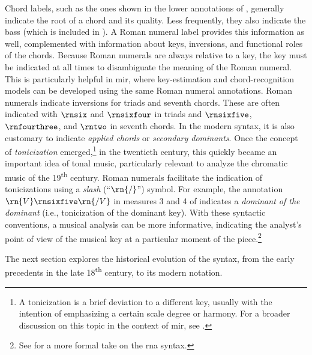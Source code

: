 

Chord labels, such as the ones shown in the lower
annotations of , generally indicate the root
of a chord and its quality. Less frequently, they also
indicate the bass (which is included in ). A
Roman numeral label provides this information as well,
complemented with information about keys, inversions, and
functional roles of the chords. Because Roman numerals are
always relative to a key, the key must be indicated at all
times to disambiguate the meaning of the Roman numeral. This
is particularly helpful in \gls{mir}, where key-estimation
and chord-recognition models can be developed using the same
Roman numeral annotations. Roman numerals indicate
inversions for triads and seventh chords. These are often
indicated with $\rnsix$ and $\rnsixfour$ in triads and
$\rnsixfive$, $\rnfourthree$, and $\rntwo$ in seventh
chords. In the modern syntax, it is also customary to
indicate \emph{applied chords} or \emph{secondary
dominants}. Once the concept of \emph{tonicization}
emerged,\footnote{A tonicization is a brief deviation to a
different key, usually with the intention of emphasizing a
certain scale degree or harmony. For a broader discussion on
this topic in the context of \gls{mir}, see
\textcite{napoleslopez2020local}.} in the twentieth century,
this quickly became an important idea of tonal music,
particularly relevant to analyze the chromatic music of the
19\textsuperscript{th} century. Roman numerals facilitate
the indication of tonicizations using a \emph{slash}
(``$\rn{/}$'') symbol. For example, the annotation
$\rn{V}\rnsixfive\rn{/V}$ in measures 3 and 4 of
 indicates a \emph{dominant of the dominant}
(i.e., tonicization of the dominant key). With these
syntactic conventions, a musical analysis can be more
informative, indicating the analyst's point of view of the
musical key at a particular moment of the
piece.\footnote{See
 for a more
formal take on the \gls{rna} syntax.}

The next section explores the historical evolution of the
syntax, from the early precedents in the late
18\textsuperscript{th} century, to its modern notation.

